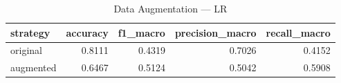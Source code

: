 \begin{table}
\caption{Data Augmentation — LR}
\begin{tabular}{lrrrr}
\toprule
strategy & accuracy & f1_macro & precision_macro & recall_macro \\
\midrule
original & 0.8111 & 0.4319 & 0.7026 & 0.4152 \\
augmented & 0.6467 & 0.5124 & 0.5042 & 0.5908 \\
\bottomrule
\end{tabular}
\end{table}
